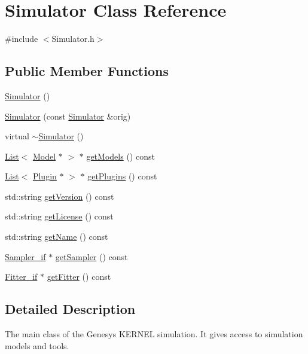 \hypertarget{class_simulator}{\section{Simulator Class Reference}
\label{class_simulator}
}


{\ttfamily \#include $<$Simulator.\-h$>$}

\subsection*{Public Member Functions}
\begin{DoxyCompactItemize}
\item 
\hyperlink{class_simulator_a031573bfcfe2e0f5c9539bcc1c7fc5d9}{Simulator} ()
\item 
\hyperlink{class_simulator_ad0a136ed876c971effe90fa749f18148}{Simulator} (const \hyperlink{class_simulator}{Simulator} \&orig)
\item 
virtual \hyperlink{class_simulator_a0f49aa04f42060a785adf77346b9de9f}{$\sim$\-Simulator} ()
\item 
\hyperlink{class_list}{List}$<$ \hyperlink{class_model}{Model} $\ast$ $>$ $\ast$ \hyperlink{class_simulator_adf2949b99c40c3c94c790786de1a038f}{get\-Models} () const 
\item 
\hyperlink{class_list}{List}$<$ \hyperlink{class_plugin}{Plugin} $\ast$ $>$ $\ast$ \hyperlink{class_simulator_a0e68b96d9af4bb7cf3f0b8a5c2e66d31}{get\-Plugins} () const 
\item 
std\-::string \hyperlink{class_simulator_a2e9d26646db9e0cc35a870514d8dcc3e}{get\-Version} () const 
\item 
std\-::string \hyperlink{class_simulator_ae180aeffe94a7b0af5fb64ce8ad29810}{get\-License} () const 
\item 
std\-::string \hyperlink{class_simulator_a767a6811df08f6327524ab6ccb715672}{get\-Name} () const 
\item 
\hyperlink{class_sampler__if}{Sampler\-\_\-if} $\ast$ \hyperlink{class_simulator_a7477e74d6751ea9e4b841178b0c42f34}{get\-Sampler} () const 
\item 
\hyperlink{class_fitter__if}{Fitter\-\_\-if} $\ast$ \hyperlink{class_simulator_a7498ab51b3112e487f73eefb6d384b74}{get\-Fitter} () const 
\end{DoxyCompactItemize}


\subsection{Detailed Description}
The main class of the Genesys K\-E\-R\-N\-E\-L simulation. It gives access to simulation models and tools. 

